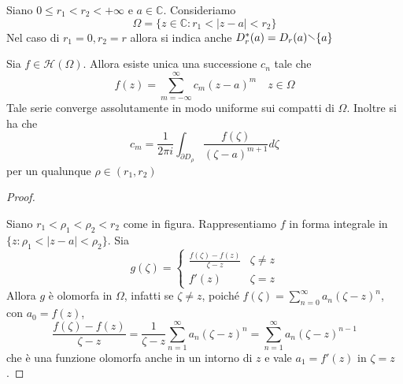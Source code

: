 Siano \(0 \le r_{1} < r_{2} < +\infty\) e \(a \in \mathbb{C}\). Consideriamo
\[
    \Omega = \{z \in \mathbb{C}: r_{1} < |z-a| < r_{2}\} 
\]
Nel caso di \(r_{1} = 0, r_{2}= r\) allora si indica anche \(D^{*}_r{(a)} =
D_r{(a)} \sminus \{a\} \) 
\begin{theorem}
    Sia \(f \in \mathcal{H}{(\Omega)}\). Allora esiste unica una successione
    \(c_{n}\) tale che 
    \[
        f{(z)} = \sum_{m=-\infty}^{\infty} c_{m} {(z-a)}^{m} \quad z \in \Omega
    \]
    Tale serie converge assolutamente in modo uniforme sui compatti di
    \(\Omega\).
    Inoltre si ha che
    \[
        c_m = \frac{1}{2\pi i} \int_{\partial D_\rho} \frac{f{(\zeta)}}{{(\zeta
        - a)}^{m+1}} d \zeta
    \]
    per un qualunque \(\rho \in (r_{1}, r_{2})\) 
\end{theorem}
\begin{proof}
\begin{figure}[ht]
    \centering
\end{figure}
    Siano \(r_{1} < \rho_{1} < \rho_{2} < r_{2}\) come in figura. Rappresentiamo \(f\) in forma
    integrale in \(\{z : \rho_{1} < |z-a| < \rho_{2}\} \). Sia 
    \[
        g{(\zeta)} = \begin{cases}
            \frac{f{(\zeta)} - f{(z)}}{\zeta - z} & \zeta \neq z \\
            f'{(z)} & \zeta = z
        \end{cases}
    \]
    Allora \(g\) è olomorfa in \(\Omega\), infatti se \(\zeta \neq z\), poiché
    \(\displaystyle f{(\zeta)} = \sum_{n=0}^{\infty} a_{n} {(\zeta - z)}^{n} \),
    con \(a_{0} = f{(z)}\),
    \[
        \frac{f{(\zeta)} - f{(z)}}{\zeta -z} = \frac{1}{\zeta-
        z}\sum_{n=1}^{\infty} a_{n} {(\zeta -z)}^{n} = \sum_{n=1}^{\infty}
        a_{n}{(\zeta - z)}^{n-1} 
    \]
    che è una funzione olomorfa anche in un intorno di \(z\) e vale
    \(a_{1} = f'{(z)}\) in \(\zeta = z\).


\end{proof}
